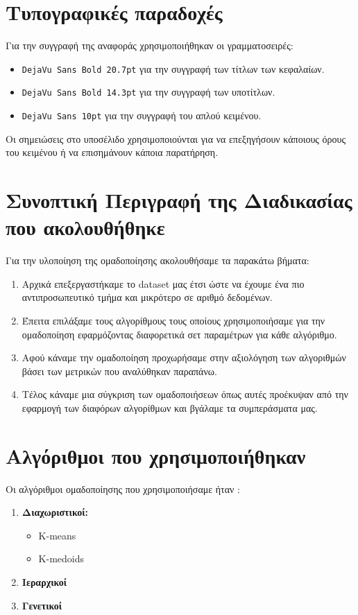 \section{Τυπογραφικές παραδοχές}
Για την συγγραφή της αναφοράς χρησιμοποιήθηκαν οι γραμματοσειρές:
\begin{itemize}
\item \texttt{DejaVu Sans Bold 20.7pt} για την συγγραφή των τίτλων των κεφαλαίων.

\item \texttt{DejaVu Sans Bold 14.3pt} για την συγγραφή των υποτίτλων.

\item \texttt{DejaVu Sans 10pt} για την συγγραφή του απλού κειμένου.
\end{itemize}

Οι σημειώσεις στο υποσέλιδο χρησιμοποιούνται για να επεξηγήσουν κάποιους όρους του κειμένου
ή να επισημάνουν κάποια παρατήρηση.

\section{Συνοπτική Περιγραφή της Διαδικασίας που ακολουθήθηκε}
Για την υλοποίηση της ομαδοποίησης ακολουθήσαμε τα παρακάτω βήματα:
\begin{enumerate}
	\item Αρχικά επεξεργαστήκαμε το dataset μας έτσι ώστε να έχουμε ένα πιο αντιπροσωπευτικό τμήμα και μικρότερο σε αριθμό δεδομένων. 
	\item Έπειτα επιλάξαμε τους αλγορίθμους τους οποίους χρησιμοποιήσαμε για την ομαδοποίηση εφαρμόζοντας διαφορετικά σετ παραμέτρων για κάθε αλγόριθμο.
	\item Αφού κάναμε την ομαδοποίηση προχωρήσαμε στην αξιολόγηση των αλγοριθμών βάσει των μετρικών που αναλύθηκαν παραπάνω.
	\item Τέλος κάναμε μια σύγκριση των ομαδοποιήσεων όπως αυτές προέκυψαν από την εφαρμογή των διαφόρων αλγορίθμων και βγάλαμε τα συμπεράσματα μας.
\end{enumerate}

\section{Αλγόριθμοι που χρησιμοποιήθηκαν}
Οι αλγόριθμοι ομαδοποίησης που χρησιμοποιήσαμε ήταν :
\begin{enumerate}
	\item \textbf{Διαχωριστικοί:}
	\begin{itemize}
		\item K-means
		\item K-medoids
	\end{itemize}  
	\item \textbf{Ιεραρχικοί}
	\item \textbf{Γενετικοί}  
\end{enumerate}

